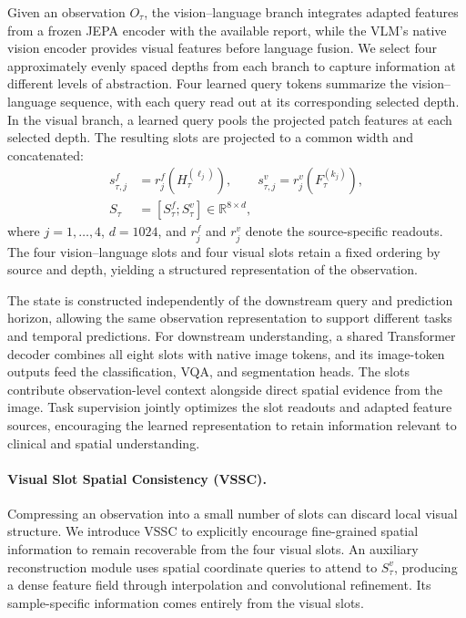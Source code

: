 Given an observation $O_\tau$, the vision--language branch integrates adapted features from a frozen JEPA encoder with the available report, while the VLM's native vision encoder provides visual features before language fusion. We select four approximately evenly spaced depths from each branch to capture information at different levels of abstraction. Four learned query tokens summarize the vision--language sequence, with each query read out at its corresponding selected depth. In the visual branch, a learned query pools the projected patch features at each selected depth. The resulting slots are projected to a common width and concatenated:
\begin{equation}
    \begin{aligned}
        s_{\tau,j}^{f}
        &=r_j^{f}\!\left(H_\tau^{(\ell_j)}\right),\qquad
        s_{\tau,j}^{v}
        =r_j^{v}\!\left(F_\tau^{(k_j)}\right),\\
        S_\tau
        &=\left[S_\tau^{f};S_\tau^{v}\right]
        \in\mathbb{R}^{8\times d},
    \end{aligned}
    \label{eq:vlm_state}
\end{equation}
where $j=1,\ldots,4$, $d=1024$, and $r_j^{f}$ and $r_j^{v}$ denote the source-specific readouts. The four vision--language slots and four visual slots retain a fixed ordering by source and depth, yielding a structured representation of the observation.

The state is constructed independently of the downstream query and prediction horizon, allowing the same observation representation to support different tasks and temporal predictions. For downstream understanding, a shared Transformer decoder combines all eight slots with native image tokens, and its image-token outputs feed the classification, VQA, and segmentation heads. The slots contribute observation-level context alongside direct spatial evidence from the image. Task supervision jointly optimizes the slot readouts and adapted feature sources, encouraging the learned representation to retain information relevant to clinical and spatial understanding.

\paragraph{Visual Slot Spatial Consistency (VSSC).}
Compressing an observation into a small number of slots can discard local visual structure. We introduce VSSC to explicitly encourage fine-grained spatial information to remain recoverable from the four visual slots. An auxiliary reconstruction module uses spatial coordinate queries to attend to $S_\tau^{v}$, producing a dense feature field through interpolation and convolutional refinement. Its sample-specific information comes entirely from the visual slots.


